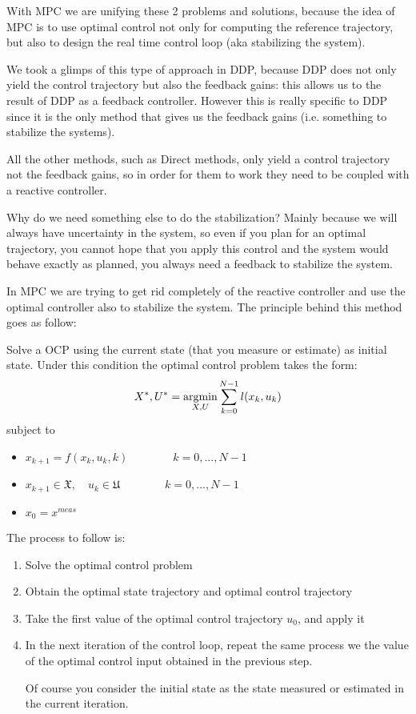 With MPC we are unifying these 2 problems and solutions, because the idea of MPC is to use optimal control not only for computing the reference trajectory, but also to design the real time control loop (aka stabilizing the system).

We took a glimps of this type of approach in DDP, because DDP does not only yield the control trajectory but also the feedback gains: this allows us to the result of DDP as a feedback controller. However this is really specific to DDP since it is the only method that gives us the feedback gains (i.e. something to stabilize the systems).

All the other methods, such as Direct methods, only yield a control trajectory not the feedback gains, so in order for them to work they need to be coupled with a reactive controller.

Why do we need something else to do the stabilization? Mainly because we will always have uncertainty in the system, so even if you plan for an optimal trajectory, you cannot hope that you apply this control and the system would behave exactly as planned, you always need a feedback to stabilize the system.

In MPC we are trying to get rid completely of the reactive controller and use the optimal controller also to stabilize the system. The principle behind this method goes as follow:

Solve a  OCP using the current state (that you measure or estimate) as initial state. Under this condition the optimal control problem takes the form:
\[X^*, U^* = \operatorname*{argmin}_{X,U} \sum_{k=0}^{N-1} l(x_k, u_k)\]
subject to
\begin{itemize}
\item $x_{k+1} = f(x_k, u_k, k)\qquad\qquad k=0,...,N-1$
\item $x_{k+1}\in\mathfrak{X}, \quad u_k\in\mathfrak{U}\qquad\qquad k = 0,...,N-1$
\item $x_0 = x^{meas}$
\end{itemize}
The process to follow is:
\begin{enumerate}
\item Solve the optimal control problem
\item Obtain the optimal state trajectory and optimal control trajectory 
\item Take the first value of the optimal control trajectory $u_0$, and apply it
\item In the next iteration of the control loop, repeat the same process we the value of the optimal control input obtained in the previous step.

Of course you consider the initial state as the state measured or estimated in the current iteration.
\end{enumerate}

